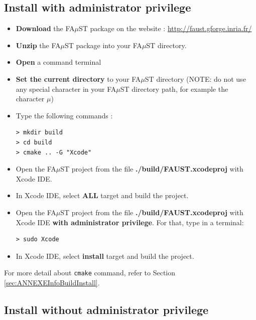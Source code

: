 \subsection{Install with administrator privilege}\label{sec:XcodeUnixBuildInstallAdmin}
 
\begin{itemize}
\item \textbf{Download} the FA$\mu$ST package on the website :  \url{http://faust.gforge.inria.fr/}
\item \textbf{Unzip} the FA$\mu$ST package into your FA$\mu$ST directory.
\item \textbf{Open} a command terminal
\item \textbf{Set the current directory} to your FA$\mu$ST directory (NOTE: do not use any special character in your FA$\mu$ST directory path, for example the character $\mu$)
\item Type the following commands : 
\begin{lstlisting}
> mkdir build
> cd build
> cmake .. -G "Xcode"
\end{lstlisting}

\item Open the FA$\mu$ST project from the file \textbf{./build/FAUST.xcodeproj} with Xcode IDE. 
\item In Xcode IDE, select \textbf{ALL} target and build the project. 
\item Open the FA$\mu$ST project from the file \textbf{./build/FAUST.xcodeproj} with Xcode IDE \textbf{with administrator privilege}. For that, type in a terminal:
\begin{lstlisting}
> sudo Xcode
\end{lstlisting}
\item In Xcode IDE, select \textbf{install} target and build the project. 
\end{itemize}

For more detail about \texttt{cmake} command, refer to Section \ref{sec:ANNEXEInfoBuildInstall}.


\subsection{Install without administrator privilege}\label{sec:XcodeUnixBuildInstallNOAdmin}
 
